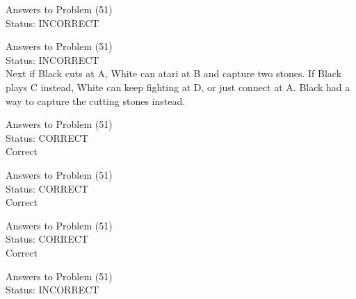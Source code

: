 \documentclass[11pt]{article}
\begin{document}
\begin{minipage}[t]{0.5\textwidth}
  {\centering
  
  Answers to Problem (51)\\
  Status: INCORRECT\\
  
  }
\end{minipage}
\begin{minipage}[t]{0.5\textwidth}
  {\centering
  
  Answers to Problem (51)\\
  Status: INCORRECT\\
  Next if Black cuts at A, White can atari at B and capture two stones. If Black plays C instead, White can keep fighting at D, or just connect at A. Black had a way to capture the cutting stones instead.\\
  }
\end{minipage}
\begin{minipage}[t]{0.5\textwidth}
  {\centering
  
  Answers to Problem (51)\\
  Status: CORRECT\\
  Correct\\
  }
\end{minipage}
\begin{minipage}[t]{0.5\textwidth}
  {\centering
  
  Answers to Problem (51)\\
  Status: CORRECT\\
  Correct\\
  }
\end{minipage}
\begin{minipage}[t]{0.5\textwidth}
  {\centering
  
  Answers to Problem (51)\\
  Status: CORRECT\\
  Correct\\
  }
\end{minipage}
\begin{minipage}[t]{0.5\textwidth}
  {\centering
  
  Answers to Problem (51)\\
  Status: INCORRECT\\
  
  }
\end{minipage}
\end{document}
